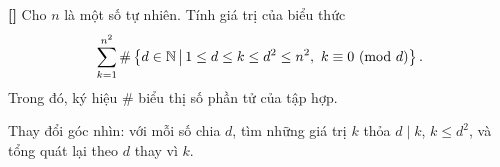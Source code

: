\documentclass[../01-divisibility.tex]{subfiles}
\begin{document}
\begin{exercise*}\label{example:ROU-2014-MO-G10-P1}\textbf{[]}
    Cho \( n \) là một số tự nhiên. Tính giá trị của biểu thức
    \[
        \sum_{k=1}^{n^2} \#\left\{ d \in \mathbb{N} \,\middle|\, 1 \le d \le k \le d^2 \le n^2,\ k \equiv 0 \ (\mathrm{mod}\ d) \right\}.
    \]
    Trong đó, ký hiệu \( \# \) biểu thị số phần tử của tập hợp.
\end{exercise*}

\begin{remark*}
    Thay đổi góc nhìn: với mỗi số chia \( d \), tìm những giá trị \( k \) thỏa \( d \mid k \), \( k \le d^2 \), và tổng quát lại theo \( d \) thay vì \( k \).
\end{remark*}

    
\end{document}
